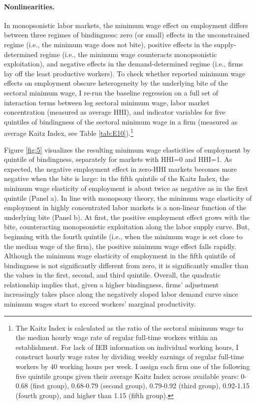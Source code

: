 \documentclass[11pt,oneside,reqno,xcolor=dvipsnames]{article} %
\begin{document}
\paragraph{Nonlinearities.} In monopsonistic labor markets, the minimum wage effect on employment differs between three regimes of bindingness: zero (or small) effects in the unconstrained regime (i.e., the minimum wage does not bite), positive effects in the supply-determined regime (i.e., the minimum wage counteracts monopsonistic exploitation), and negative effects in the demand-determined regime (i.e., firms lay off the least productive workers). To check whether reported minimum wage effects on employment obscure heterogeneity by the underlying bite of the sectoral minimum wage, I re-run the baseline regression on a full set of interaction terms between log sectoral minimum wage, labor market concentration (measured as average HHI), and indicator variables for five quintiles of bindingness of the sectoral minimum wage in a firm (measured as average Kaitz Index, see Table \ref{tab:E10}).\footnote{The Kaitz Index is calculated as the ratio of the sectoral minimum wage to the median hourly wage rate of regular full-time workers within an establishment. For lack of IEB information on individual working hours, I construct hourly wage rates by dividing weekly earnings of regular full-time workers by 40 working hours per week. I assign each firm one of the following five quintile groups given their average Kaitz Index across available years: 0-0.68 (first group), 0.68-0.79 (second group), 0.79-0.92 (third group), 0.92-1.15 (fourth group), and higher than 1.15 (fifth group).}

Figure \ref{fig:5} visualizes the resulting minimum wage elasticities of employment by quintile of bindingness, separately for markets with HHI=0 and HHI=1. As expected, the negative employment effect in zero-HHI markets becomes more negative when the bite is large: in the fifth quintile of the Kaitz Index, the minimum wage elasticity of employment is about twice as negative as in the first quintile (Panel a). In line with monopsony theory, the minimum wage elasticity of employment in highly concentrated labor markets is a non-linear function of the underlying bite (Panel b). At first, the positive employment effect grows with the bite, counteracting monopsonistic exploitation along the labor supply curve. But, beginning with the fourth quintile (i.e., when the minimum wage is set close to the median wage of the firm), the positive minimum wage effect falls rapidly. Although the minimum wage elasticity of employment in the fifth quintile of bindingness is not significantly different from zero, it is significantly smaller than the values in the first, second, and third quintile. Overall, the quadratic relationship implies that, given a higher bindingness, firms' adjustment increasingly takes place along the negatively sloped labor demand curve since minimum wages start to exceed workers' marginal productivity.
\end{document}
